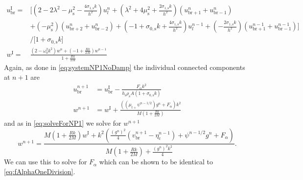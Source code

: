 \documentclass{article}
\begin{document}
\begin{subequations}\label{eq:intermediateDampFact}
    \begin{align}
        u^\text{I}_\text{br} = &\Big[(2-2\lambda^2-\mu_\text{s}^2-\frac{4\sigma_{1,\text{s}}k}{h^2})u_l^n + (\lambda^2 + 4\mu_\text{s}^2+\frac{2\sigma_{1,\text{s}}k}{h^2})(u_{\text{br}+1}^n + u_{\text{br}-1}^n)\nonumber\\
        &+ (-\mu_\text{s}^2)(u_{\text{br}+2}^n+u_{\text{br}-2}^n)+ (-1 + \sigma_{0,\text{s}}k+\frac{4\sigma_{1,\text{s}}k}{h^2})u_l^{n-1}+(-\frac{2\sigma_{1,\text{s}}k}{h^2})(u_{\text{br}+1}^{n-1} + u_{\text{br}-1}^{n-1})\Big]\\
        &/ \Big[1 + \sigma_{0,\text{s}}k\Big] \nonumber\\
        w^\text{I} = & \frac{(2-\omega_0^2k^2)w^n+(-1+\frac{Rk}{2M})w^{n-1}}{1+\frac{Rk}{2M}}%
    \end{align}
\end{subequations}
Again, as done in \eqref{eq:systemNP1NoDamp} the individual connected components at $n+1$ are
\begin{subequations}
\begin{align}
    u_\text{br}^{n+1}&=u_\text{br}^\text{I} - \frac{F_\alpha k^2}{h_\text{s}\rho_\text{s}A(1+\sigma_{0,\text{s}}k)}\\
        w^{n+1} &= w^\text{I} + \frac{((\mu_{t+}\psi^{n-1/2})g^n + F_\alpha)k^2}{M (1+\frac{Rk}{2M})}%
        \end{align}
\end{subequations}
and as in \eqref{eq:solveForNP1} we solve for $w^{n+1}$
\begin{equation}
    w^{n+1} = \frac{M(1+\frac{Rk}{2M})w^\text{I}+k^2\left(\frac{(g^n)^2}{4}(v_\text{br}^{n+1}-\eta_\text{c}^{n-1})+\psi^{n-1/2}g^n+F_\alpha\right)}{M(1+\frac{Rk}{2M})+\frac{(g^n)^2k^2}{4}}.
\end{equation}
We can use this to solve for $F_\alpha$ which can be shown to be identical to \eqref{eq:fAlphaOneDivision}.
\end{document}
